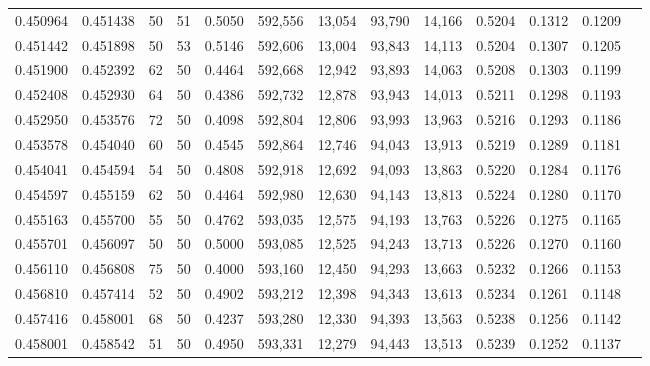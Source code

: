 \begin{tabular}{rrrrrrrrrrrrr}
0.450964 & 0.451438 &    50 &  51 &                                     0.5050 & 592,556 &  13,054 &  93,790 &  14,166 & 0.5204 & 0.1312 & 0.1209 \\
0.451442 & 0.451898 &    50 &  53 &                                     0.5146 & 592,606 &  13,004 &  93,843 &  14,113 & 0.5204 & 0.1307 & 0.1205 \\
0.451900 & 0.452392 &    62 &  50 &                                     0.4464 & 592,668 &  12,942 &  93,893 &  14,063 & 0.5208 & 0.1303 & 0.1199 \\
0.452408 & 0.452930 &    64 &  50 &                                     0.4386 & 592,732 &  12,878 &  93,943 &  14,013 & 0.5211 & 0.1298 & 0.1193 \\
0.452950 & 0.453576 &    72 &  50 &                                     0.4098 & 592,804 &  12,806 &  93,993 &  13,963 & 0.5216 & 0.1293 & 0.1186 \\
0.453578 & 0.454040 &    60 &  50 &                                     0.4545 & 592,864 &  12,746 &  94,043 &  13,913 & 0.5219 & 0.1289 & 0.1181 \\
0.454041 & 0.454594 &    54 &  50 &                                     0.4808 & 592,918 &  12,692 &  94,093 &  13,863 & 0.5220 & 0.1284 & 0.1176 \\
0.454597 & 0.455159 &    62 &  50 &                                     0.4464 & 592,980 &  12,630 &  94,143 &  13,813 & 0.5224 & 0.1280 & 0.1170 \\
0.455163 & 0.455700 &    55 &  50 &                                     0.4762 & 593,035 &  12,575 &  94,193 &  13,763 & 0.5226 & 0.1275 & 0.1165 \\
0.455701 & 0.456097 &    50 &  50 &                                     0.5000 & 593,085 &  12,525 &  94,243 &  13,713 & 0.5226 & 0.1270 & 0.1160 \\
0.456110 & 0.456808 &    75 &  50 &                                     0.4000 & 593,160 &  12,450 &  94,293 &  13,663 & 0.5232 & 0.1266 & 0.1153 \\
0.456810 & 0.457414 &    52 &  50 &                                     0.4902 & 593,212 &  12,398 &  94,343 &  13,613 & 0.5234 & 0.1261 & 0.1148 \\
0.457416 & 0.458001 &    68 &  50 &                                     0.4237 & 593,280 &  12,330 &  94,393 &  13,563 & 0.5238 & 0.1256 & 0.1142 \\
0.458001 & 0.458542 &    51 &  50 &                                     0.4950 & 593,331 &  12,279 &  94,443 &  13,513 & 0.5239 & 0.1252 & 0.1137 \\

\end{tabular}
